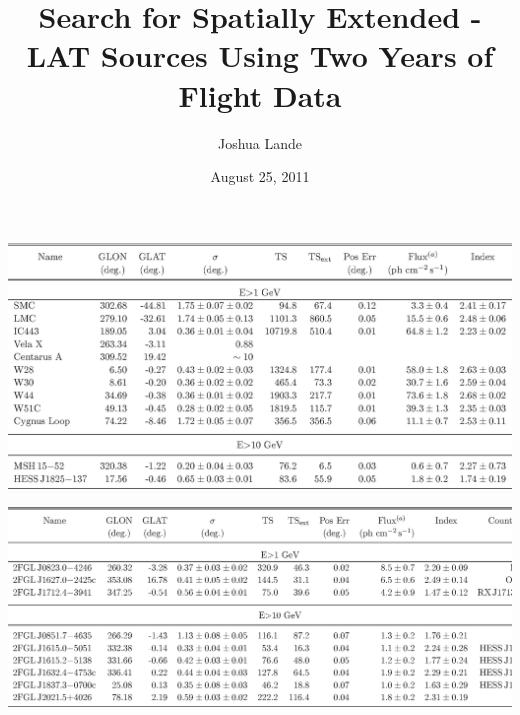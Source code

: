 \documentclass[12pt]{beamer}
\title{Search for Spatially Extended \fermi-LAT Sources Using Two Years of Flight
Data}
\author{Joshua Lande}
\institute{SLAC/Stanford}
\date{August 25, 2011}
\begin{document}


\begin{frame}
  \begin{center}
    \includegraphics[scale=0.5]{tables/table3.eps}
  \end{center}
\end{frame}

\begin{frame}
  \begin{center}
    \includegraphics[scale=0.5]{tables/table4.eps}
  \end{center}
\end{frame}
\end{document}
